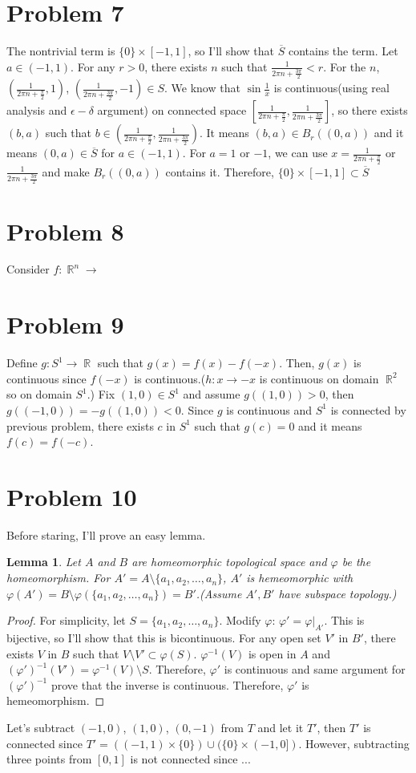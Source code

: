 \documentclass{article}
\DeclareMathOperator{\rr}{\mathbb{R}}
\newtheorem{lemma}{Lemma}
\begin{document}
\section*{Problem 7}
The nontrivial term is $\{0\}\times [-1, 1]$, so I'll show that $\overline{S}$ contains the term. Let $a\in (-1, 1)$. For any $r>0$, there exists $n$ such that $ \frac{1}{2\pi n + \frac{3\pi}{2}}<r$. For the $n$, $\left(\frac{1}{2\pi n + \frac{\pi}{2}}, 1\right)$, $\left(\frac{1}{2\pi n + \frac{3\pi}{2}}, -1\right)\in S$. We know that $\sin{\frac{1}{x}}$ is continuous(using real analysis and $\epsilon-\delta$ argument) on connected space $\left[\frac{1}{2\pi n + \frac{\pi}{2}},\frac{1}{2\pi n + \frac{3\pi}{2}}\right]$, so there exists $(b,a)$ such that $b\in \left(\frac{1}{2\pi n + \frac{\pi}{2}},\frac{1}{2\pi n + \frac{3\pi}{2}}\right)$. It means $(b,a)\in B_r((0, a))$ and it means $(0, a)\in \overline{S}$ for $a\in (-1, 1)$. For $a=1$ or $-1$, we can use $x=\frac{1}{2\pi n + \frac{\pi}{2}}$ or $\frac{1}{2\pi n + \frac{3\pi}{2}}$ and make $B_r((0, a))$ contains it. Therefore, $\{0\}\times[-1,1]\subset \overline{S}$
\section*{Problem 8}
Consider $f:\rr^n\rightarrow$
\section*{Problem 9}
Define $g:S^1\rightarrow \rr$ such that $g(x)=f(x)-f(-x)$. Then, $g(x)$ is continuous since $f(-x)$ is continuous.($h:x\rightarrow -x$ is continuous on domain $\rr^2$ so on domain $S^1$.) Fix $(1,0)\in S^1$ and assume $g((1,0))>0$, then $g((-1, 0))=-g((1,0))<0$. Since $g$ is continuous and $S^1$ is connected by previous problem, there exists $c$ in $S^1$ such that $g(c)=0$ and it means $f(c)=f(-c)$.
\section*{Problem 10}
Before staring, I'll prove an easy lemma.
\begin{lemma}
Let $A$ and $B$ are homeomorphic topological space and $\varphi$ be the homeomorphism. For $A'=A\setminus\{a_1, a_2, \ldots, a_n\}$, $A'$ is hemeomorphic with $\varphi(A')=B\setminus\varphi(\{a_1, a_2, \ldots, a_n\})=B'$.(Assume $A',B'$ have subspace topology.)
\end{lemma}
\begin{proof}
For simplicity, let $S=\{a_1, a_2, \ldots, a_n\}$. Modify $\varphi$: $\varphi'=\varphi|_{A'}$. This is bijective, so I'll show that this is bicontinuous. For any open set $V'$ in $B'$, there exists $V$ in $B$ such that $V\setminus V'\subset \varphi(S)$. $\varphi^{-1}(V)$ is open in $A$ and $\left(\varphi'\right)^{-1}(V')=\varphi^{-1}(V)\setminus S$. Therefore, $\varphi'$ is continuous and same argument for $\left(\varphi'\right)^{-1}$ prove that the inverse is continuous. Therefore, $\varphi'$ is hemeomorphism.
\end{proof}
Let's subtract $(-1, 0)$, $(1, 0)$, $(0, -1)$ from $T$ and let it $T'$, then $T'$ is connected since $T'= ((-1,1)\times\{0\})\cup (\{0\}\times (-1,0])$. However, subtracting three points from $[0, 1]$ is not connected since ...
\end{document}
